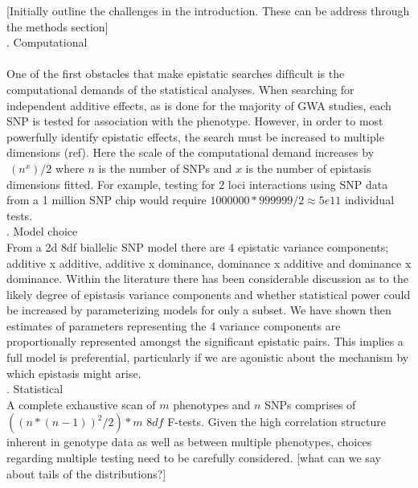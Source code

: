 \documentclass{article}
\begin{document}
[Initially outline the challenges in the introduction. These can be address through the methods section] \\
. Computational \\ 
 \\
\newline
One of the first obstacles that make epistatic searches difﬁcult is the computational demands of the statistical analyses. When searching for independent additive effects, as is done for the majority of GWA studies, each SNP is tested for association with the phenotype. However, in order to most powerfully identify epistatic effects, the search must be increased to multiple dimensions (ref). Here the scale of the computational demand increases by $~(n^x)/2$ where $n$ is the number of SNPs and $x$ is the number of epistasis dimensions fitted. For example, testing for 2 loci interactions using SNP data from a 1 million SNP chip would require $1000000 * 999999/2 \approx 5e11$ individual tests. \\     
. Model choice \\
\newline
From a 2d 8df biallelic SNP model there are 4 epistatic variance components; additive x additive, additive x
dominance, dominance x additive and dominance x dominance. Within the literature there has been considerable discussion as to the likely degree of epistasis variance components and whether statistical power could be increased by parameterizing models for only a subset. We have shown then estimates of parameters representing the 4 variance components are proportionally represented amongst the significant epistatic pairs. This implies a full model is preferential, particularly if we are agonistic about the mechanism by which epistasis might arise. \\  
. Statistical \\
\newline
A complete exhaustive scan of $m$ phenotypes and $n$ SNPs comprises of $((n*(n-1))^2/2)*m$ $8df$ F-tests. Given the high correlation structure inherent in genotype data as well as between multiple phenotypes, choices regarding multiple testing need to be carefully considered. [what can we say about tails of the distributions?]
\end{document}
